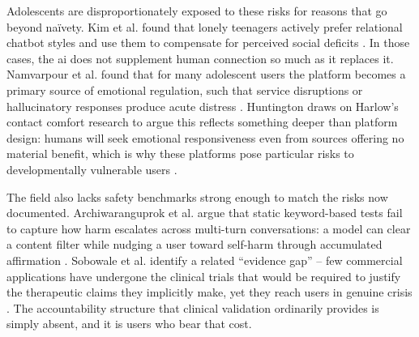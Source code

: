 Adolescents are disproportionately exposed to these risks for reasons that go beyond na\"ivety. Kim et al. found that lonely teenagers actively prefer relational chatbot styles and use them to compensate for perceived social deficits \cite[pp.~4--5]{kim_i_2025}. In those cases, the \gls{ai} does not supplement human connection so much as it replaces it. Namvarpour et al. found that for many adolescent users the platform becomes a primary source of emotional regulation, such that service disruptions or hallucinatory responses produce acute distress \cite[p.~7]{namvarpour_understanding_2026}. Huntington draws on Harlow's contact comfort research to argue this reflects something deeper than platform design: humans will seek emotional responsiveness even from sources offering no material benefit, which is why these platforms pose particular risks to developmentally vulnerable users \cite[pp.~178--180]{huntington_ai_2025}.

The field also lacks safety benchmarks strong enough to match the risks now documented. Archiwaranguprok et al. argue that static keyword-based tests fail to capture how harm escalates across multi-turn conversations: a model can clear a content filter while nudging a user toward self-harm through accumulated affirmation \cite[p.~16]{archiwaranguprok_simulating_2025}. Sobowale et al. identify a related ``evidence gap'' -- few commercial applications have undergone the clinical trials that would be required to justify the therapeutic claims they implicitly make, yet they reach users in genuine crisis \cite[p.~2]{sobowale_evaluating_2025}. The accountability structure that clinical validation ordinarily provides is simply absent, and it is users who bear that cost.